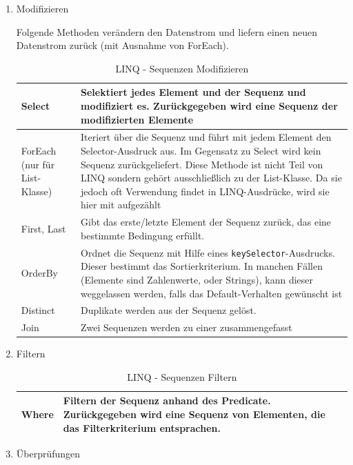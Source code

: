 \begin{enumerate}
\item Modifizieren

Folgende Methoden verändern den Datenstrom und liefern einen neuen Datenstrom
zurück (mit Ausnahme von ForEach).

\bigskip
\begin{table}[H]
	\centering
\begin{tabularx}{\textwidth}{|p{130 pt}|X|}
		\hline
Select & Selektiert jedes Element und der Sequenz und modifiziert es. Zurückgegeben wird eine Sequenz der modifizierten Elemente\\	\hline
ForEach (nur für List-Klasse) & Iteriert über die Sequenz und führt mit jedem Element den Selector-Ausdruck aus. Im Gegensatz zu Select wird kein Sequenz zurückgeliefert. Diese Methode ist nicht Teil von LINQ sondern gehört ausschließlich zu der List-Klasse. Da sie jedoch oft Verwendung findet in LINQ-Ausdrücke, wird sie hier mit aufgezählt\\	\hline
First,  Last & Gibt das erste/letzte Element der Sequenz zurück, das eine bestimmte Bedingung erfüllt.\\	\hline
OrderBy & Ordnet die Sequenz mit Hilfe eines \texttt{keySelector}-Ausdrucks. Dieser bestimmt das Sortierkriterium. In manchen Fällen (Elemente sind Zahlenwerte, oder Strings), kann dieser weggelassen werden, falls das Default-Verhalten gewünscht ist\\	\hline
Distinct & Duplikate werden aus der Sequenz gelöst.\\	\hline
Join & Zwei Sequenzen werden zu einer zusammengefasst\\	\hline
\end{tabularx}
	\medskip
	\caption{LINQ - Sequenzen Modifizieren}
\end{table}


\item Filtern

\bigskip

\begin{table}[H]
	\centering
\begin{tabularx}{\textwidth}{|p{130 pt}|X|}
		\hline
Where & Filtern der Sequenz anhand des Predicate. Zurückgegeben wird eine Sequenz von Elementen, die das Filterkriterium entsprachen.\\	\hline
\end{tabularx}
	\medskip
	\caption{LINQ - Sequenzen Filtern}
\end{table}

\item Überprüfungen


\end{enumerate}
